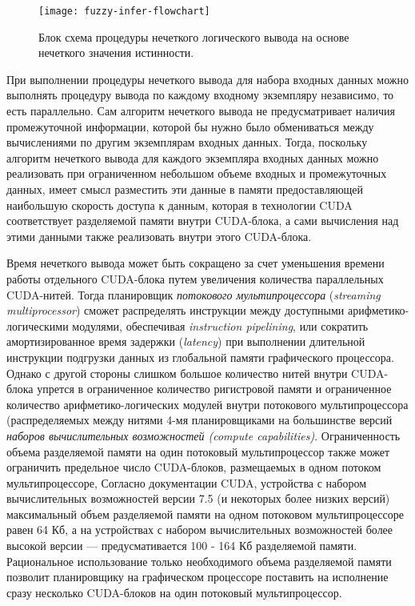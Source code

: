 \begin{figure}[ht]
	\centering
	\texttt{[image: fuzzy-infer-flowchart]}
	\caption{Блок схема процедуры нечеткого логического вывода на основе нечеткого значения истинности.}
	\label{fig:fuzzy-infer-flowchart}
\end{figure}

При выполнении процедуры нечеткого вывода для набора входных данных можно выполнять процедуру вывода по каждому входному экземпляру независимо, то есть параллельно. Сам алгоритм нечеткого вывода не предусматривает наличия промежуточной информации, которой бы нужно было обмениваться между вычислениями по другим экземплярам входных данных. Тогда, поскольку алгоритм нечеткого вывода для каждого экземпляра входных данных можно реализовать при ограниченном небольшом объеме входных и промежуточных данных, имеет смысл разместить эти данные в памяти предоставляющей наибольшую скорость доступа к данным, которая в технологии CUDA соответствует разделяемой памяти внутри CUDA-блока, а сами вычисления над этими данными также реализовать внутри этого CUDA-блока.

Время нечеткого вывода может быть сокращено за счет уменьшения времени работы отдельного CUDA-блока путем увеличения количества параллельных CUDA-нитей. Тогда планировщик  \textit{потокового мультипроцессора} (\textit{streaming multiprocessor}) сможет распределять инструкции между доступными арифметико-логическими модулями, обеспечивая \textit{instruction pipelining}, или сократить амортизированное время задержки (\textit{latency}) при выполнении длительной инструкции подгрузки данных из глобальной памяти графического процессора. Однако с другой стороны слишком большое количество нитей внутри CUDA-блока упрется в ограниченное количество ригистровой памяти и ограниченное количество арифметико-логических модулей внутри потокового мультипроцессора (распределяемых между нитями 4-мя планировщиками на большинстве версий \textit{наборов вычислительных возможностей (compute capabilities)}. Ограниченность объема разделяемой памяти на один потоковый мультипроцессор также может ограничить предельное число CUDA-блоков, размещаемых в одном потоком мультипроцессоре, Согласно документации CUDA, устройства с набором вычислительных возможностей версии 7.5 (и некоторых более низких версий) максимальный объем разделяемой памяти на одном потоковом мультипроцессоре равен 64 Кб, а на устройствах с набором вычислительных возможностей более высокой версии --- предусмативается 100 - 164 Кб разделяемой памяти. Рациональное использование только необходимого объема разделяемой памяти позволит планировщику на графическом процессоре поставить на исполнение сразу несколько CUDA-блоков на один потоковый мультипроцессор.

